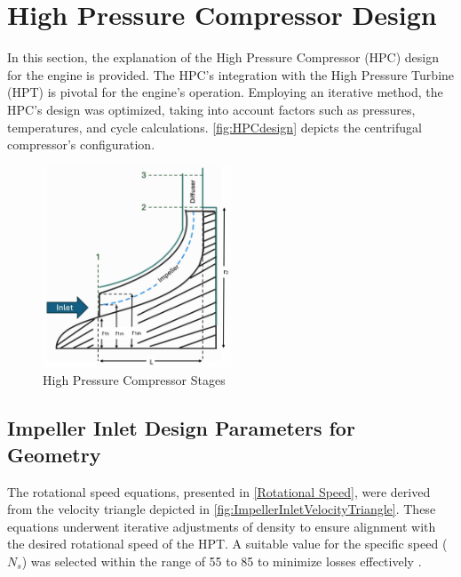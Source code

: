 \documentclass[12pt, letter]{report}
\begin{document}
\chapter{High Pressure Compressor Design}

In this section, the explanation of the High Pressure Compressor (HPC) design for the engine is provided. The HPC's integration with the High Pressure Turbine (HPT) is pivotal for the engine's operation. Employing an iterative method, the HPC's design was optimized, taking into account factors such as pressures, temperatures, and cycle calculations. \autoref{fig:HPCdesign} depicts the centrifugal compressor's configuration.

\begin{figure}[H]
    \centering
    \includegraphics[width=0.5\textwidth]{figures/HPCdesign.jpeg}
    \caption{High Pressure Compressor Stages \cite{lectureslides}}
    \label{fig:HPCdesign}
\end{figure}

\section{Impeller Inlet Design Parameters for Geometry}

The rotational speed equations, presented in \autoref{Rotational Speed}, were derived from the velocity triangle depicted in \autoref{fig:ImpellerInletVelocityTriangle}. These equations underwent iterative adjustments of density to ensure alignment with the desired rotational speed of the HPT. A suitable value for the specific speed ($N_s$) was selected within the range of 55 to 85 to minimize losses effectively \cite{lectureslides}.
\end{document}
